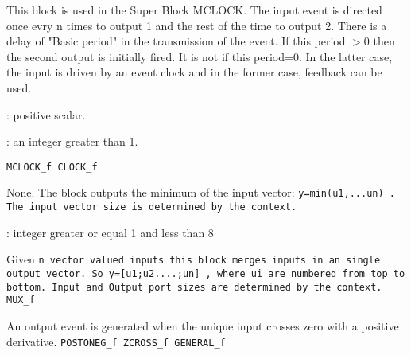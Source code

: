 This block is used in the Super Block MCLOCK. The input event is
directed once evry n times to output 1 and the rest of the time
to output 2. There is a delay of "Basic period" in the transmission
of the event. If this period $>$0 then the second output is initially
fired. It is not if this period=0. In the latter case, the input
is driven by an event clock and in the former case, feedback can
be used.
\begin{scitem}
\item[{\verb?Basic period?}]
: positive scalar.
\item[{\verb?n ?}]
: an integer greater than 1. 
\end{scitem}%
{\verb?MCLOCK_f CLOCK_f?} \pageref{MCLOCKfCLOCKf}







%
%


\label{MINf}

None.
The block outputs the minimum of the input vector:
%
\tt y=min(u1,...un)%
\rm .
The input vector size is determined by the context.

%
%


\label{MUXf}

\begin{scitem}
\item[{\verb?number of output ports?}]
:
integer greater or equal 1 and less than 8
\end{scitem}%
Given %
\tt n %
\rm vector valued inputs this block merges inputs in an single
output vector. So %
\tt y=[u1;u2....;un]%
\rm , where %
\tt ui %
\rm are numbered
from top to bottom. Input and Output port sizes are determined by the
context.
{\verb?MUX_f?} \pageref{MUXf}
%
%


\label{NEGTOPOSf}

An output event is generated when the unique input crosses zero
with a positive derivative.
{\verb?POSTONEG_f ZCROSS_f GENERAL_f?} \pageref{POSTONEGfZCROSSfGENERALf}





